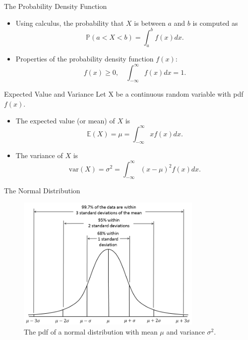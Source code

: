 \documentclass{beamer}
\newcommand{\pr}{\mathbb{P}}
\newcommand{\E}{\mathbb{E}}
\newcommand{\var}{\text{var}}
\let\thefootnote\relax\footnotetext{\tiny{*  Office Hours: Wed \& Fri 10:00 - 11:30 AM, KMC 8-174}}
\begin{document}
\begin{frame}{The Probability Density Function}
\begin{itemize}
\item Using calculus, the probability that $X$ is between $a$ and $b$ is computed as
$$
\pr(a < X < b) = \int_{a}^b f(x)dx.
$$

\item Properties of the probability density function $f(x)$:
$$ f(x)\geq 0, \quad \int_{-\infty}^{\infty} f(x)dx=1.$$
\end{itemize}


\let\thefootnote\relax{}
\end{frame}

\begin{frame}{Expected Value and Variance}
Let X be a continuous random variable with pdf $f(x)$.
\begin{itemize}
\item The expected value (or mean) of $X$ is
$$ \E (X) = \mu = \int_{-\infty}^{\infty} x f(x) dx.$$
\item The variance of $X$ is
$$ \var (X) = \sigma^2 = \int_{-\infty}^{\infty} (x-\mu)^2 f(x) dx.$$
\end{itemize}

\let\thefootnote\relax{}
\end{frame}


\begin{frame}{The Normal Distribution}
\begin{figure}
    \caption{The pdf of a normal distribution with mean $\mu$ and variance $\sigma^2$.}
    \includegraphics[width=0.8\textwidth]{figures/normal_pdf.png}
\end{figure}
\end{frame}
\end{document}
